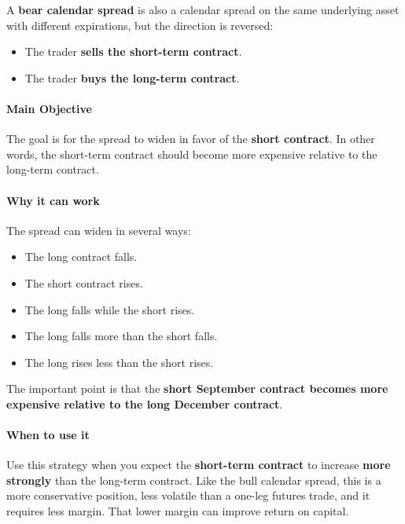 \documentclass[12pt,openany]{book}
\begin{document}
A \textbf{bear calendar spread} is also a calendar spread on the same underlying asset with different expirations, but the direction is reversed:

\begin{itemize}[leftmargin=*]
    \item The trader \textbf{sells the short-term contract}.
    \item The trader \textbf{buys the long-term contract}.
\end{itemize}

\paragraph{Main Objective}

The goal is for the spread to widen in favor of the \textbf{short contract}. In other words, the short-term contract should become more expensive relative to the long-term contract.

\paragraph{Why it can work}

The spread can widen in several ways:

\begin{itemize}[leftmargin=*]
    \item The long contract falls.
    \item The short contract rises.
    \item The long falls while the short rises.
    \item The long falls more than the short falls.
    \item The long rises less than the short rises.
\end{itemize}

The important point is that the \textbf{short September contract becomes more expensive relative to the long December contract}.

\paragraph{When to use it}

Use this strategy when you expect the \textbf{short-term contract} to increase \textbf{more strongly} than the long-term contract. Like the bull calendar spread, this is a more conservative position, less volatile than a one-leg futures trade, and it requires less margin. That lower margin can improve return on capital.
\end{document}
